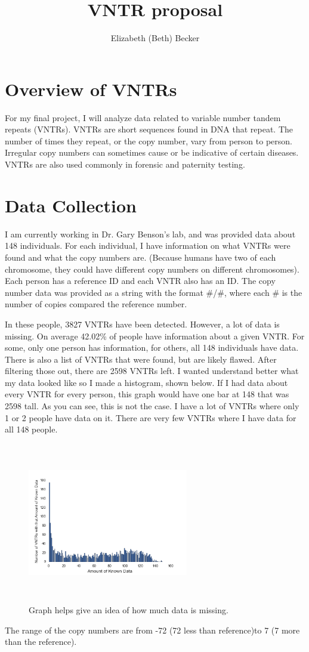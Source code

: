 \documentclass[]{article}
\title{VNTR proposal}
\author{Elizabeth (Beth) Becker}
\begin{document}
\maketitle
\section{Overview of VNTRs}

For my final project, I will analyze data related to variable number tandem repeats (VNTRs). VNTRs are short sequences found in DNA that repeat. The number of times they repeat, or the copy number, vary from person to person. Irregular copy numbers can sometimes cause or be indicative of certain diseases. VNTRs are also used commonly in forensic and paternity testing. 

\section{Data Collection}
I am currently working in Dr. Gary Benson's lab, and was provided data about 148 individuals. For each individual, I have information on what VNTRs were found and what the copy numbers are. (Because humans have two of each chromosome, they could have different copy numbers on different chromosomes). Each person has a reference ID and each VNTR also has an ID. The copy number data was provided as a string with the format \#/\#, where each \# is the number of copies compared the reference number. 

 In these people, 3827 VNTRs have been detected. However, a lot of data is missing. On average 42.02\% of people have information about a given VNTR. For some, only one person has information, for others, all 148 individuals have data. There is also a list of VNTRs that were found, but are likely flawed. After filtering those out, there are 2598 VNTRs left. I wanted understand better what my data looked like so I made a histogram, shown below. If I had data about every VNTR for every person, this graph would have one bar at 148 that was 2598 tall. As you can see, this is not the case. I have a lot of VNTRs where only 1 or 2 people have data on it. There are very few VNTRs where I have data for all 148 people. 

\begin{figure}[H]
	\centering
    \includegraphics[width=7cm,height=7cm,keepaspectratio]{histogram.png}
    \caption{Graph helps give an idea of how much data is missing.}
\end{figure}
 The range of the copy numbers are from -72 (72 less than reference)to 7 (7 more than the reference). 
 
\end{document}
